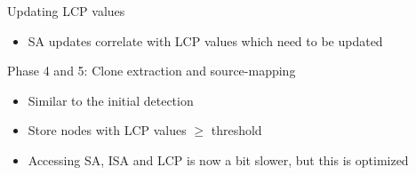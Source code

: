 \documentclass[aspectratio=1610, xcolor=table]{beamer}
\begin{document}
\begin{frame}[fragile]{Updating LCP values}
    \begin{itemize}
        \item SA updates correlate with LCP values which need to be updated
    \end{itemize}
    \begin{table}[t]
	\begin{center}
	\end{center}
	\label{tab:lcpupdates}
\end{table}
\end{frame}

\begin{frame}[fragile]{Phase 4 and 5: Clone extraction and source-mapping}
    \begin{itemize}
        \item Similar to the initial detection
        \item Store nodes with LCP values $\geq$ threshold
        \item Accessing SA, ISA and LCP is now a bit slower, but this is optimized
    \end{itemize}
\end{frame}
\end{document}

